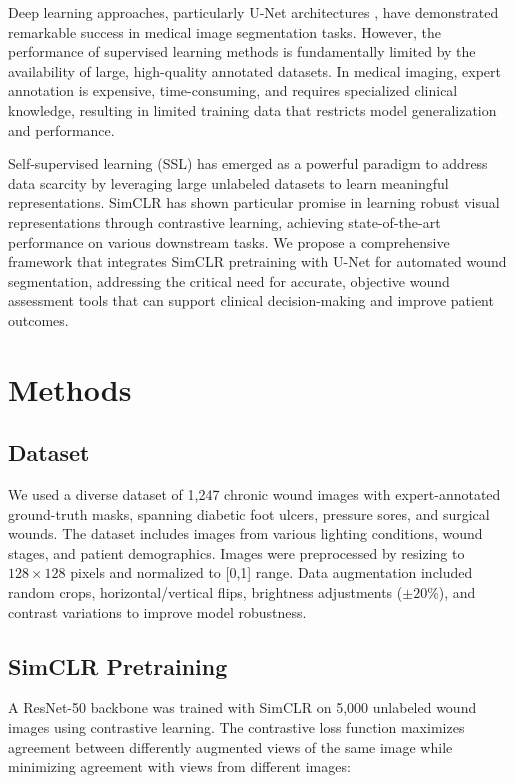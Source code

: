 \documentclass[conference]{IEEEtran}
\begin{document}
Deep learning approaches, particularly U-Net architectures \cite{ronneberger2015unet}, have demonstrated remarkable success in medical image segmentation tasks. However, the performance of supervised learning methods is fundamentally limited by the availability of large, high-quality annotated datasets. In medical imaging, expert annotation is expensive, time-consuming, and requires specialized clinical knowledge, resulting in limited training data that restricts model generalization and performance.

Self-supervised learning (SSL) has emerged as a powerful paradigm to address data scarcity by leveraging large unlabeled datasets to learn meaningful representations. SimCLR \cite{chen2020simclr} has shown particular promise in learning robust visual representations through contrastive learning, achieving state-of-the-art performance on various downstream tasks. We propose a comprehensive framework that integrates SimCLR pretraining with U-Net for automated wound segmentation, addressing the critical need for accurate, objective wound assessment tools that can support clinical decision-making and improve patient outcomes.

\section{Methods}
\subsection{Dataset}
We used a diverse dataset of 1,247 chronic wound images with expert-annotated ground-truth masks, spanning diabetic foot ulcers, pressure sores, and surgical wounds. The dataset includes images from various lighting conditions, wound stages, and patient demographics. Images were preprocessed by resizing to $128\times128$ pixels and normalized to [0,1] range. Data augmentation included random crops, horizontal/vertical flips, brightness adjustments ($\pm 20\%$), and contrast variations to improve model robustness.

\subsection{SimCLR Pretraining}
A ResNet-50 backbone was trained with SimCLR on 5,000 unlabeled wound images using contrastive learning. The contrastive loss function maximizes agreement between differently augmented views of the same image while minimizing agreement with views from different images:
\end{document}
